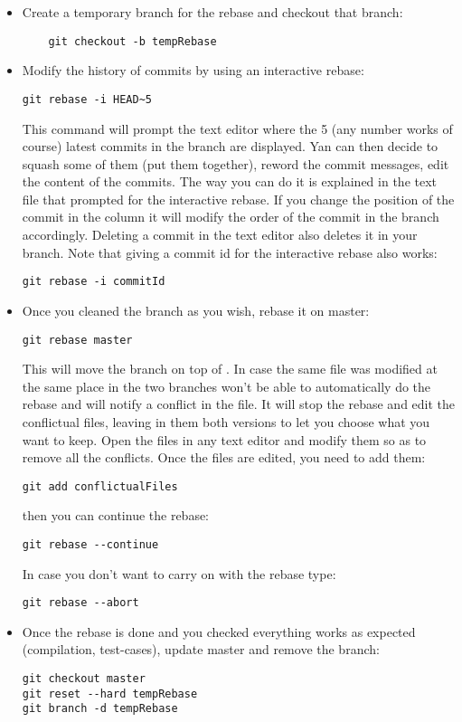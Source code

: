\begin{itemize}
\item Create a temporary branch for the rebase and checkout that branch:
  \begin{lstlisting}
    git checkout -b tempRebase
  \end{lstlisting}

\item Modify the history of commits by using an interactive rebase:
\begin{lstlisting}
git rebase -i HEAD~5
\end{lstlisting}
This command will prompt the text editor where the 5 (any number works of course) latest commits in the branch are displayed.
Yan can then decide to squash some of them (put them together), reword the commit messages, edit the content of the commits.
The way you can do it is explained in the text file that  prompted for the interactive rebase.
If you change the position of the commit in the column it will modify the order of the commit in the branch accordingly.
Deleting a commit in the text editor also deletes it in your branch.
Note that giving a commit id for the interactive rebase also works:
\begin{lstlisting}
git rebase -i commitId
\end{lstlisting}

\item Once you cleaned the branch as you wish, rebase it on master:
\begin{lstlisting}
git rebase master
\end{lstlisting}
This will move the branch  on top of .
In case the same file was modified at the same place in the two branches  won't be able to automatically do the rebase and will notify a conflict in the file.
It will stop the rebase and edit the conflictual files, leaving in them both versions to let you choose what you want to keep.
Open the files in any text editor and modify them so as to remove all the conflicts.
Once the files are edited, you need to add them:
\begin{lstlisting}
git add conflictualFiles
\end{lstlisting}
then you can continue the rebase:
\begin{lstlisting}
git rebase --continue
\end{lstlisting}
In case you don't want to carry on with the rebase type:
\begin{lstlisting}
git rebase --abort
\end{lstlisting}

\item Once the rebase is done and you checked everything works as expected (compilation, test-cases), update master and remove the  branch:
\begin{lstlisting}
git checkout master
git reset --hard tempRebase
git branch -d tempRebase
\end{lstlisting}

\end{itemize}
